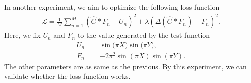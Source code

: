 \begin{frame}
In another experiment, we aim to optimize the following loss function
\begin{align}
    \mathcal{L}=\frac{1}{M}\sum_{n=1}^{M}\left( \hat{G} * F_n -U_n\right)^2 + \lambda\left( \displaystyle \Delta(\hat{G} * F_n)  - F_n \right)^2.
\end{align}
Here, we fix $U_n$ and $F_n$ to the value generated by the test function
\begin{align}
    U_n&= \sin{\bigl( \pi X \bigr)}\sin{\bigl( \pi Y \bigr)},\\
    F_n&= -2\pi^2\sin{(\pi X)}\sin{(\pi Y)}.
\end{align} 
The other parameters are as same as the previous. By this experiment, we can validate whether the loss function works.
\end{frame}


